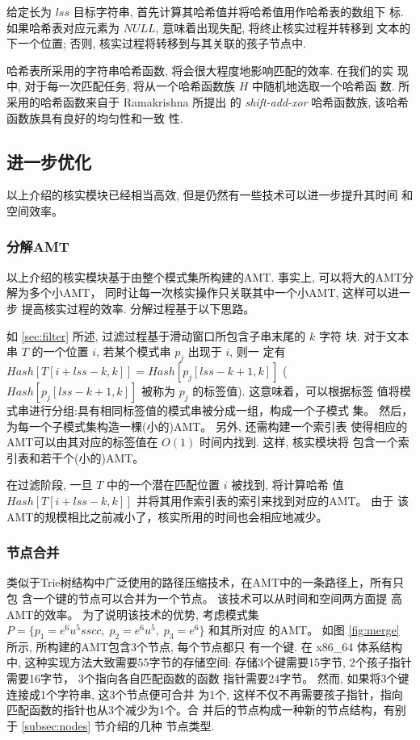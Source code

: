 \documentclass{ws-ijprai}
\begin{document}
给定长为 $lss$ 目标字符串, 首先计算其哈希值并将哈希值用作哈希表的数组下
标. 如果哈希表对应元素为 $NULL$, 意味着出现失配, 将终止核实过程并转移到
文本的下一个位置; 否则, 核实过程将转移到与其关联的孩子节点中.

哈希表所采用的字符串哈希函数, 将会很大程度地影响匹配的效率. 在我们的实
现中, 对于每一次匹配任务, 将从一个哈希函数族 $H$ 中随机地选取一个哈希函
数. 所采用的哈希函数来自于 Ramakrishna \cite{Ramakrishna1997} 所提出
的 \emph{shift-add-xor} 哈希函数族, 该哈希函数族具有良好的均匀性和一致
性.

\subsection{进一步优化}
\label{sec:further improments}

以上介绍的核实模块已经相当高效, 但是仍然有一些技术可以进一步提升其时间
和空间效率。

\subsubsection{分解AMT}
\label{sec:divide amt}

以上介绍的核实模块基于由整个模式集所构建的AMT. 事实上, 可以将大的AMT分
解为多个小AMT， 同时让每一次核实操作只关联其中一个小AMT, 这样可以进一步
提高核实过程的效率. 分解过程基于以下思路。

如 \ref{sec:filter} 所述, 过滤过程基于滑动窗口所包含子串末尾的 $k$ 字符
块. 对于文本串 $T$ 的一个位置 $i$, 若某个模式串 $p_j$ 出现于 $i$, 则一
定有 $Hash[T[i+lss-k,k]] = Hash[p_j[lss-k+1,k]]$
($Hash[p_j[lss-k+1,k]]$ 被称为 $p_j$ 的标签值). 这意味着，可以根据标签
值将模式串进行分组:具有相同标签值的模式串被分成一组，构成一个子模式
集。 然后，为每一个子模式集构造一棵(小的)AMT。 另外, 还需构建一个索引表
使得相应的AMT可以由其对应的标签值在 $O(1)$ 时间内找到. 这样, 核实模块将
包含一个索引表和若干个(小的)AMT。

在过滤阶段, 一旦 $T$ 中的一个潜在匹配位置 $i$ 被找到, 将计算哈希
值 $Hash[T[i+lss-k,k]]$ 并将其用作索引表的索引来找到对应的AMT。 由于
该AMT的规模相比之前减小了，核实所用的时间也会相应地减少。

\subsubsection{节点合并}
\label{sec:node merge}

类似于Trie树结构中广泛使用的路径压缩技术，在AMT中的一条路径上，所有只包
含一个键的节点可以合并为一个节点。 该技术可以从时间和空间两方面提
高AMT的效率。 为了说明该技术的优势, 考虑模式集
$P=\{p_1=e^6u^5sscc,\; p_2=e^6u^5,\; p_3=e^6\}$ 和其所对应
的AMT。 如图 \ref{fig:merge} 所示, 所构建的AMT包含3个节点, 每个节点都只
有一个键. 在 x86\_64 体系结构中, 这种实现方法大致需要55字节的存储空间:
存储3个键需要15字节, 2个孩子指针需要16字节， 3个指向各自匹配函数的函数
指针需要24字节。 然而, 如果将3个键连接成1个字符串, 这3个节点便可合并
为1个, 这样不仅不再需要孩子指针，指向匹配函数的指针也从3个减少为1个。合
并后的节点构成一种新的节点结构，有别于 \ref{subsec:nodes} 节介绍的几种
节点类型.
\end{document}
